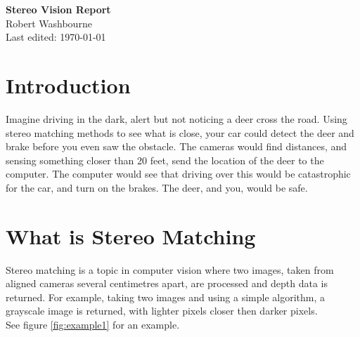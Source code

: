 \documentclass[11pt,fleqn]{article}
\begin{document}
\begin{center}
\Large{\textbf{Stereo Vision Report}}\\[5pt]
\large{Robert Washbourne}\\
Last edited: \today
\end{center}

\tableofcontents

\section{Introduction}

Imagine driving in the dark, alert but not noticing a deer cross the road. Using stereo matching methods to see what is close, your car could detect the deer and brake before you even saw the obstacle. The cameras would find distances, and sensing something closer than 20 feet, send the location of the deer to the computer. The computer would see that driving over this would be catastrophic for the car, and turn on the brakes. The deer, and you, would be safe.


\section{What is Stereo Matching}

Stereo matching is a topic in computer vision where two images, taken from aligned cameras several centimetres apart, are processed and depth data is returned. For example, taking two images and using a simple algorithm, a grayscale image is returned, with lighter pixels closer then darker pixels.\\[6pt]
%
See figure \ref{fig:example1} for an example.


\end{document}
